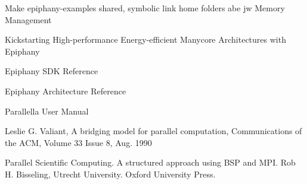 \documentclass[fleqn]{article}
\renewcommand{\(}{\left(}
\renewcommand{\)}{\right)}
\begin{document}
Make epiphany-examples shared, symbolic link home folders abe jw
Memory Management


\begin{thebibliography}{9}

  Kickstarting High-performance Energy-efficient Manycore Architectures with Epiphany

  Epiphany SDK Reference

  Epiphany Architecture Reference

  Parallella User Manual

    Leslie G. Valiant, A bridging model for parallel computation, Communications of the ACM, Volume 33 Issue 8, Aug. 1990

    Parallel Scientific Computing. A structured approach using BSP and MPI. Rob H. Bisseling, Utrecht University. Oxford University Press.

\end{thebibliography}
\end{document}
